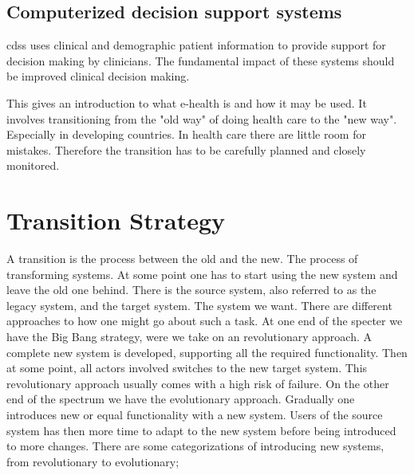 \newpage
\subsection{Computerized decision support systems}
\gls{cdss} uses clinical and demographic patient information to provide support for decision making by clinicians. The fundamental impact of these systems should be improved clinical decision making.


This gives an introduction to what e-health is and how it may be used. 
It involves transitioning from the "old way" of doing health care to the "new way".
Especially in developing countries.
In health care there are little room for mistakes.
Therefore the transition has to be carefully planned and closely monitored.



\section{Transition Strategy}
A transition is the process between the old and the new.
The process of transforming systems.
At some point one has to start using the new system and leave the old one behind.
There is the source system, also referred to as the legacy system, and the target
system. The system we want. 
There are different approaches to how one might go about such a task.
At one end of the specter we have the Big Bang strategy, were we
take on an revolutionary approach. A complete new system is developed,
supporting all the required functionality. Then at some point, all actors involved switches to the new target system. This revolutionary approach usually comes with a high risk of failure. 
On the other end of the spectrum we have the evolutionary approach. 
Gradually one introduces new or equal functionality with a new system.
Users of the source system has then more time to adapt to the new system before being introduced to more changes.
There are some categorizations of introducing new systems, from revolutionary to evolutionary;

